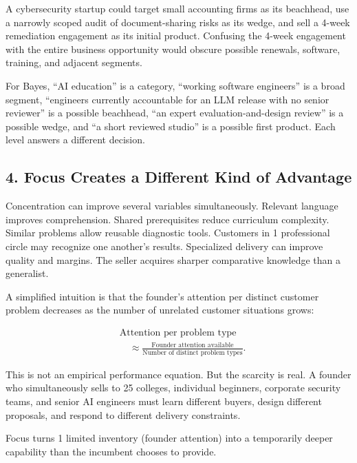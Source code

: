 A cybersecurity startup could target small accounting firms as its beachhead, use a narrowly scoped audit of document-sharing risks as its wedge, and sell a 4-week remediation engagement as its initial product. Confusing the 4-week engagement with the entire business opportunity would obscure possible renewals, software, training, and adjacent segments.

For Bayes, ``AI education'' is a category, ``working software engineers'' is a broad segment, ``engineers currently accountable for an LLM release with no senior reviewer'' is a possible beachhead, ``an expert evaluation-and-design review'' is a possible wedge, and ``a short reviewed studio'' is a possible first product. Each level answers a different decision.

\subsection*{4. Focus Creates a Different Kind of Advantage}

Concentration can improve several variables simultaneously. Relevant language improves comprehension. Shared prerequisites reduce curriculum complexity. Similar problems allow reusable diagnostic tools. Customers in 1 professional circle may recognize one another's results. Specialized delivery can improve quality and margins. The seller acquires sharper comparative knowledge than a generalist.

A simplified intuition is that the founder's attention per distinct customer problem decreases as the number of unrelated customer situations grows:

\begin{equation}
\begin{aligned}
&\text{Attention per problem type} \\
&\quad\approx \frac{\text{Founder attention available}}{\text{Number of distinct problem types}}.
\end{aligned}
\end{equation}

This is not an empirical performance equation. But the scarcity is real. A founder who simultaneously sells to 25 colleges, individual beginners, corporate security teams, and senior AI engineers must learn different buyers, design different proposals, and respond to different delivery constraints.

Focus turns 1 limited inventory (founder attention) into a temporarily deeper capability than the incumbent chooses to provide.

